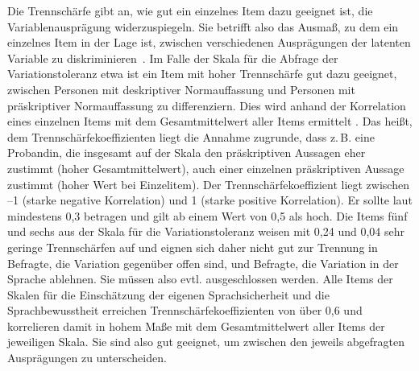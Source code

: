 Die Trennschärfe gibt an, wie gut ein einzelnes Item dazu geeignet ist, die Variablen\-aus\-prä\-gung widerzuspiegeln. 
Sie betrifft also \glqq das Ausmaß, zu dem ein einzelnes Item in der Lage ist, zwischen verschiedenen Ausprägungen der latenten Variable zu diskriminieren\grqq{}~\citep[275]{Gerich2010}. 
Im Falle der Skala für die Abfrage der Variationstoleranz etwa ist ein Item mit hoher Trennschärfe gut dazu geeignet, zwischen Personen mit deskriptiver Normauffassung und Personen mit präskriptiver Normauffassung zu differenziern. 
Dies wird anhand der Korrelation eines einzelnen Items mit dem Gesamtmittelwert aller Items ermittelt \citep[s.][289]{Doring2016}. 
Das heißt, dem Trennschärfekoeffizienten liegt die Annahme zugrunde, dass z.\,B. eine Probandin, die insgesamt auf der Skala den präskriptiven Aussagen eher zustimmt (hoher Gesamtmittelwert), auch einer einzelnen präskriptiven Aussage zustimmt (hoher Wert bei Einzelitem). 
Der Trennschärfekoeffizient liegt zwischen --1 (starke negative Korrelation) und 1 (starke positive Korrelation). 
Er sollte laut \citet[478]{Doring2016} mindestens 0,3 betragen und gilt ab einem Wert von 0,5 als hoch. 
Die Items fünf und sechs aus der Skala für die Variationstoleranz weisen mit 0,24 und 0,04 sehr geringe Trennschärfen auf und eignen sich daher nicht gut zur Trennung in Befragte, die Variation gegenüber offen sind, und Befragte, die Variation in der Sprache ablehnen. 
Sie müssen also evtl. ausgeschlossen werden. 
Alle Items der Skalen für die Einschätzung der eigenen Sprachsicherheit und die Sprachbewusstheit erreichen Trennschärfekoeffizienten von über 0,6 und korrelieren damit in hohem Maße mit dem Gesamtmittelwert aller Items der jeweiligen Skala. 
Sie sind also gut geeignet, um zwischen den jeweils abgefragten Ausprägungen zu unterscheiden. 

